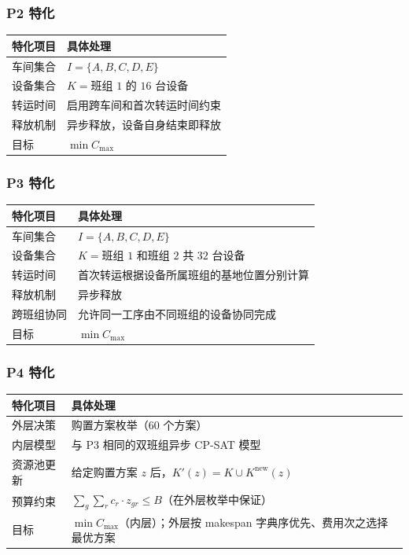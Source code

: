 \documentclass[UTF8,a4paper,12pt]{ctexart}
\begin{document}
\subsubsection{P2 特化}
\begin{center}
\begin{tabular}{ll}
\toprule
特化项目 & 具体处理 \\
\midrule
车间集合 & $I = \{A, B, C, D, E\}$ \\
设备集合 & $K = \text{班组 1 的 16 台设备}$ \\
转运时间 & 启用跨车间和首次转运时间约束 \\
释放机制 & 异步释放，设备自身结束即释放 \\
目标 & $\min C_{\max}$ \\
\bottomrule
\end{tabular}
\end{center}

\subsubsection{P3 特化}
\begin{center}
\begin{tabular}{ll}
\toprule
特化项目 & 具体处理 \\
\midrule
车间集合 & $I = \{A, B, C, D, E\}$ \\
设备集合 & $K = \text{班组 1 和班组 2 共 32 台设备}$ \\
转运时间 & 首次转运根据设备所属班组的基地位置分别计算 \\
释放机制 & 异步释放 \\
跨班组协同 & 允许同一工序由不同班组的设备协同完成 \\
目标 & $\min C_{\max}$ \\
\bottomrule
\end{tabular}
\end{center}

\subsubsection{P4 特化}
\begin{center}
\begin{tabular}{ll}
\toprule
特化项目 & 具体处理 \\
\midrule
外层决策 & 购置方案枚举（60 个方案） \\
内层模型 & 与 P3 相同的双班组异步 CP-SAT 模型 \\
资源池更新 & 给定购置方案 $z$ 后，$K'(z) = K \cup K^{\text{new}}(z)$ \\
预算约束 & $\sum_g \sum_r c_r \cdot z_{gr} \leq B$（在外层枚举中保证） \\
目标 & $\min C_{\max}$（内层）；外层按 makespan 字典序优先、费用次之选择最优方案 \\
\bottomrule
\end{tabular}
\end{center}
\end{document}
